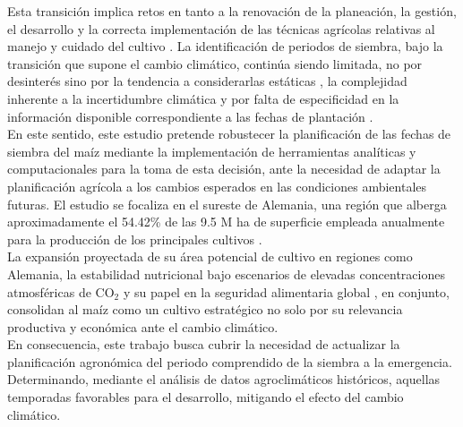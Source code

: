 Esta transición implica retos en tanto a la renovación de la planeación, la gestión, el desarrollo y la correcta implementación de las técnicas agrícolas relativas al manejo y cuidado del cultivo \citep{Parent_2018, DONMEZ_2023}. La identificación de periodos de siembra, bajo la transición que supone el cambio climático, continúa siendo limitada, no por desinterés sino por la tendencia a considerarlas estáticas \citep{Parker_2016}, la complejidad inherente a la incertidumbre climática \citep{Waha_2011} y por falta de especificidad en la información disponible correspondiente a las fechas de plantación  \citep{Portmann_2010, Sacks_2010}.\\

 En este sentido, este estudio pretende robustecer la planificación de las fechas de siembra del maíz mediante la implementación de herramientas analíticas y computacionales para la toma de esta decisión, ante la necesidad de adaptar la planificación agrícola a los cambios esperados en las condiciones ambientales futuras. El estudio se focaliza en el sureste de Alemania, una región que alberga aproximadamente el 54.42\% de las 9.5 M ha de superficie empleada anualmente para la producción de los principales cultivos \citep{Duden_2024}.\\

La expansión proyectada de su área potencial de cultivo en regiones como Alemania, la estabilidad nutricional bajo escenarios de elevadas concentraciones atmosféricas de CO$_2$ \citep{Myers_2014} y su papel en la seguridad alimentaria global \citep{TANUMIHARDJO_2020}, en conjunto, consolidan al maíz como un cultivo estratégico no solo por su relevancia productiva y económica ante el cambio climático.\\


En consecuencia, este trabajo busca cubrir la necesidad de actualizar la planificación agronómica del periodo comprendido de la siembra a la emergencia. Determinando, mediante el análisis de datos agroclimáticos históricos, aquellas temporadas favorables para el desarrollo, mitigando el efecto del cambio climático.
